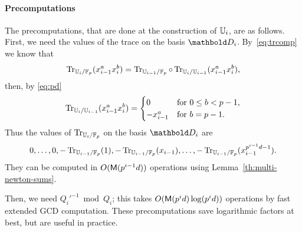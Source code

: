 \paragraph{Precomputations}
The precomputations, that are done at the construction of $\mathbb{U}_i$, are
as follows.  First, we need the values of the trace on the basis
$\basis{D}_i$. By~\eqref{eq:trcomp} we know that
\begin{equation}
  \label{eq:86}
  \operatorname{Tr}_{\mathbb{U}_i/\mathbb{F}_p}(x_{i-1}^ax_i^b) = 
  \operatorname{Tr}_{\mathbb{U}_{i-1}/\mathbb{F}_p}\circ\operatorname{Tr}_{\mathbb{U}_i/\mathbb{U}_{i-1}}(x_{i-1}^ax_i^b)
  \text{,}
\end{equation}
then, by \eqref{eq:pd}
\begin{equation}
  \label{eq:87}
  \operatorname{Tr}_{\mathbb{U}_i/\mathbb{U}_{i-1}}(x_{i-1}^ax_i^b) =
  \begin{cases}
    0 &\text{for $0\le b < p-1$,}\\
    -x_{i-1}^a &\text{for $b=p-1$.}
  \end{cases}
\end{equation}
Thus the values of $\operatorname{Tr}_{\mathbb{U}_i/\mathbb{F}_p}$ on the basis $\basis{D}_i$ are 
\begin{equation}
  \label{eq:88}
  0, \ldots, 0, -\operatorname{Tr}_{\mathbb{U}_{i-1}/\mathbb{F}_p}(1), -\operatorname{Tr}_{\mathbb{U}_{i-1}/\mathbb{F}_p}(x_{i-1}), \ldots, -\operatorname{Tr}_{\mathbb{U}_{i-1}/\mathbb{F}_p}(x_{i-1}^{p^{i-1}d-1})
  \text{.}
\end{equation}
They can be computed in $O(\mathsf{M}(p^{i-1}d))$ operations using
Lemma~\ref{th:multi-newton-sums}.

Then, we need ${Q_i'}^{-1} \bmod Q_i$; this takes $O(\mathsf{M}(p^id)
\log(p^id))$ operations by fast extended GCD computation.  These
precomputations save logarithmic factors at best, but are useful in
practice.


%

